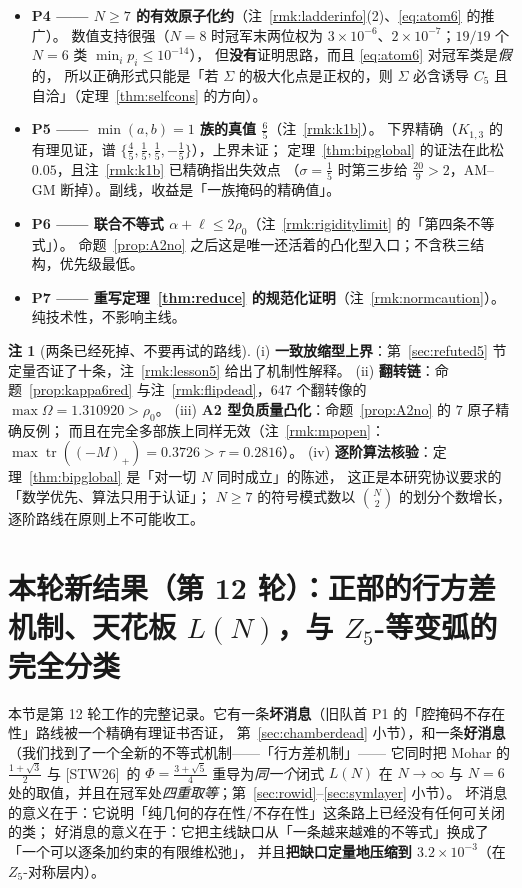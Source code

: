 \documentclass[UTF8,11pt]{ctexart}
\theoremstyle{definition}
\newtheorem{remark}[theorem]{注}
\newcommand{\tr}{\operatorname{tr}}
\newcommand{\STW}{\textup{[STW26]}}
\begin{document}
\begin{itemize}[leftmargin=1.6em,itemsep=3pt]
所以这一条不可能靠「$\frac54$ 型」的界完成，必须真的改进尾和。
\item \textbf{P4 —— $N\ge7$ 的有效原子化约}（注~\ref{rmk:ladderinfo}(2)、\eqref{eq:atom6} 的推广）。
数值支持很强（$N=8$ 时冠军末两位权为 $3\times10^{-6}$、$2\times10^{-7}$；$19/19$ 个 $N=6$ 类 $\min_ip_i\le10^{-14}$），
但\textbf{没有}证明思路，而且 \eqref{eq:atom6} 对冠军类是\emph{假}的，
所以正确形式只能是「若 $\Sigma$ 的极大化点是正权的，则 $\Sigma$ 必含诱导 $C_5$ 且自洽」（定理~\ref{thm:selfcons} 的方向）。
\item \textbf{P5 —— $\min(a,b)=1$ 族的真值 $\frac65$}（注~\ref{rmk:k1b}）。
下界精确（$K_{1,3}$ 的有理见证，谱 $\{\frac45,\frac15,\frac15,-\frac15\}$），上界未证；
定理~\ref{thm:bipglobal} 的证法在此松 $0.05$，且注~\ref{rmk:k1b} 已精确指出失效点
（$\sigma=\frac15$ 时第三步给 $\frac{20}9>2$，AM--GM 断掉）。副线，收益是「一族掩码的精确值」。
\item \textbf{P6 —— 联合不等式 $\alpha+\ell\le2\rho_0$}（注~\ref{rmk:rigiditylimit} 的「第四条不等式」）。
命题~\ref{prop:A2no} 之后这是唯一还活着的凸化型入口；不含秩三结构，优先级最低。
\item \textbf{P7 —— 重写定理~\ref{thm:reduce} 的规范化证明}（注~\ref{rmk:normcaution}）。纯技术性，不影响主线。
\end{itemize}

\begin{remark}[两条已经死掉、不要再试的路线]\label{rmk:deadroutes}
(i) \textbf{一致放缩型上界}：第~\ref{sec:refuted5} 节定量否证了十条，注~\ref{rmk:lesson5} 给出了机制性解释。
(ii) \textbf{翻转链}：命题~\ref{prop:kappa6red} 与注~\ref{rmk:flipdead}，$647$ 个翻转像的 $\max\Omega=1.310920>\rho_0$。
(iii) \textbf{A2 型负质量凸化}：命题~\ref{prop:A2no} 的 $7$ 原子精确反例；
而且在完全多部族上同样无效（注~\ref{rmk:mpopen}：$\max\tr((-M)_+)=0.3726>\tau=0.2816$）。
(iv) \textbf{逐阶算法核验}：定理~\ref{thm:bipglobal} 是「对一切 $N$ 同时成立」的陈述，
这正是本研究协议要求的「数学优先、算法只用于认证」；
$N\ge7$ 的符号模式数以 $\binom{N}{2}$ 的划分个数增长，逐阶路线在原则上不可能收工。
\end{remark}


\section{本轮新结果（第 12 轮）：正部的行方差机制、天花板 $L(N)$，与 $Z_5$-等变弧的完全分类}\label{sec:rowvar}

本节是第 12 轮工作的完整记录。它有一条\textbf{坏消息}（旧队首 P1 的「腔掩码不存在性」路线被一个精确有理证书否证，
第~\ref{sec:chamberdead} 小节），和一条\textbf{好消息}（我们找到了一个全新的不等式机制——「行方差机制」——
它同时把 Mohar 的 $\frac{1+\sqrt3}2$ 与 \STW\ 的 $\Phi=\frac{3+\sqrt5}4$ 重导为\emph{同一个}闭式 $L(N)$ 在
$N\to\infty$ 与 $N=6$ 处的取值，并且在冠军处\emph{四重取等}；第~\ref{sec:rowid}--\ref{sec:symlayer} 小节）。
坏消息的意义在于：它说明「纯几何的存在性/不存在性」这条路上已经没有任何可关闭的类；
好消息的意义在于：它把主线缺口从「一条越来越难的不等式」换成了「一个可以逐条加约束的有限维松弛」，
并且\textbf{把缺口定量地压缩到 $3.2\times10^{-3}$}（在 $Z_5$-对称层内）。
\end{document}
